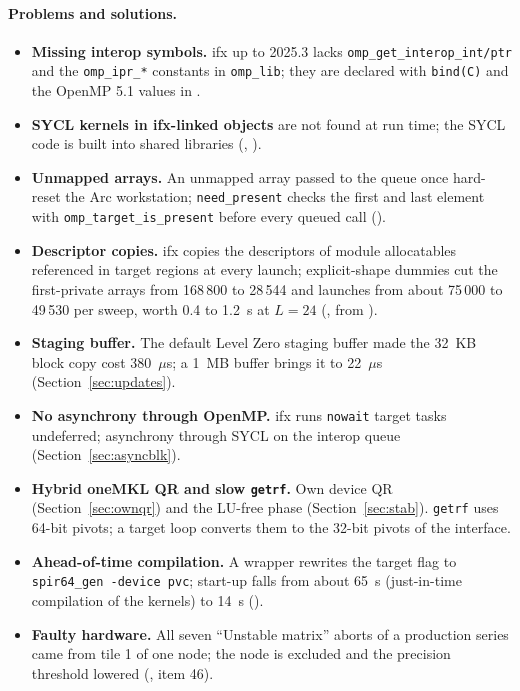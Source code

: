 \paragraph{Problems and solutions.}
\begin{itemize}
\item \textbf{Missing interop symbols.} ifx up to 2025.3 lacks \texttt{omp\_get\_interop\_int/ptr} and the \texttt{omp\_ipr\_*} constants in \texttt{omp\_lib}; they are declared with \texttt{bind(C)} and the OpenMP 5.1 values in .
\item \textbf{SYCL kernels in ifx-linked objects} are not found at run time; the SYCL code is built into shared libraries (, ).
\item \textbf{Unmapped arrays.} An unmapped array passed to the queue once hard-reset the Arc workstation; \texttt{need\_present} checks the first and last element with \texttt{omp\_target\_is\_present} before every queued call ().
\item \textbf{Descriptor copies.} ifx copies the descriptors of module allocatables referenced in target regions at every launch; explicit-shape dummies cut the first-private arrays from 168\,800 to 28\,544 and launches from about 75\,000 to 49\,530 per sweep, worth 0.4 to 1.2~s at $L=24$ (, from ). %
\item \textbf{Staging buffer.} The default Level Zero staging buffer made the 32~KB block copy cost 380~$\mu$s; a 1~MB buffer brings it to 22~$\mu$s (Section~\ref{sec:updates}).
\item \textbf{No asynchrony through OpenMP.} ifx runs \texttt{nowait} target tasks undeferred; asynchrony through SYCL on the interop queue (Section~\ref{sec:asyncblk}).
\item \textbf{Hybrid oneMKL QR and slow \texttt{getrf}.} Own device QR (Section~\ref{sec:ownqr}) and the LU-free phase (Section~\ref{sec:stab}). \texttt{getrf} uses 64-bit pivots; a target loop converts them to the 32-bit pivots of the interface.
\item \textbf{Ahead-of-time compilation.} A wrapper rewrites the target flag to \texttt{spir64\_gen -device pvc}; start-up falls from about 65~s (just-in-time compilation of the kernels) to 14~s (). %
\item \textbf{Faulty hardware.} All seven ``Unstable matrix'' aborts of a production series came from tile 1 of one node; the node is excluded and the precision threshold lowered (, item 46).
\end{itemize}

